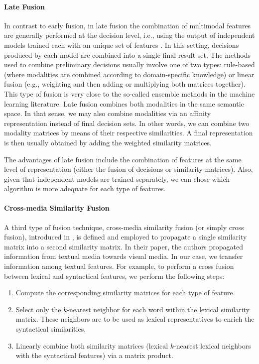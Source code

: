 \paragraph{Late Fusion}
In contrast to early fusion, in late fusion the combination of multimodal features are generally performed at the decision level, i.e., using the output of independent models trained  each with an unique set of features \cite{ClinchantAC11}. In this setting,  decisions produced by each model are combined into a single final result set.
%
The methods used to combine preliminary decisions usually involve one of two types: rule-based (where modalities are combined according to domain-specific knowledge) or linear fusion (e.g., weighting and then adding or multiplying both matrices together). This type of fusion is very close to the so-called ensemble methods in the machine learning literature.
%
Late fusion combines both modalities in the same semantic space. In that sense,  we may also combine modalities via an affinity representation instead of final decision sets. In other words, we can combine two modality matrices by means of their respective similarities. A final representation is then usually obtained by adding the weighted similarity matrices.
%

The advantages of late fusion include the combination of features at the same level of representation (either the fusion of decisions or similarity matrices). Also, given that independent models are trained separately, we can chose which algorithm is more adequate for each type of
features.

\paragraph{Cross-media Similarity Fusion}
%
A third type of fusion technique, cross-media similarity fusion (or simply cross fusion),   introduced in \cite{Ah-PineCC15,ClinchantAC11}, is defined and employed to propagate a single similarity matrix into a second similarity matrix. In their paper, the authors propagated information from textual media towards visual media. In our case, we transfer information among textual features. For example, to perform a cross fusion between lexical and syntactical features, we perform the following steps: 
\begin{enumerate}
\item Compute the corresponding similarity matrices for each type of feature.
\item Select only the $k$-nearest neighbor for each word within the lexical similarity matrix. These neighbors are to be used as lexical representatives to enrich the syntactical similarities.
\item Linearly combine both similarity matrices (lexical $k$-nearest lexical neighbors with the syntactical features) via a matrix product.
\end{enumerate}  

